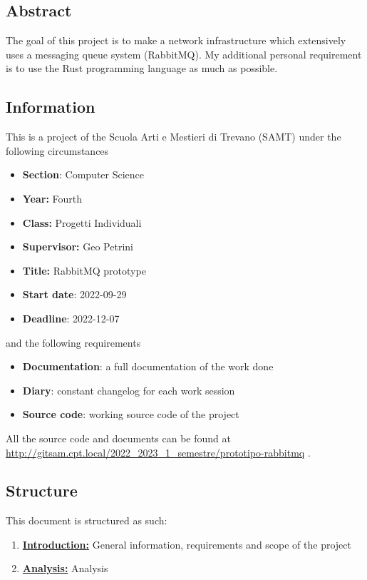 \documentclass[../documentation.tex]{subfiles}
\begin{document}
\subsection{Abstract}

The goal of this project is to make a network infrastructure
which extensively uses a messaging queue system (RabbitMQ).
My additional personal requirement is to use the Rust programming language
as much as possible.

\subsection{Information}

This is a project of the Scuola Arti e Mestieri di Trevano (SAMT) under the following circumstances

\begin{itemize}
    \item \textbf{Section}: Computer Science
    \item \textbf{Year:} Fourth
    \item \textbf{Class:} Progetti Individuali
    \item \textbf{Supervisor:} Geo Petrini
    \item \textbf{Title:} RabbitMQ prototype
    \item \textbf{Start date}: 2022-09-29
    \item \textbf{Deadline}: 2022-12-07
\end{itemize}

and the following requirements

\begin{itemize}
    \item \textbf{Documentation}: a full documentation of the work done
    \item \textbf{Diary}: constant changelog for each work session
    \item \textbf{Source code}: working source code of the project
\end{itemize}

All the source code and documents can be found at
\href{http://gitsam.cpt.local/2022\_2023\_1\_semestre/prototipo-rabbitmq}
{http://gitsam.cpt.local/2022\_2023\_1\_semestre/prototipo-rabbitmq}
\cite{gitrepo}.


\subsection{Structure}

This document is structured as such:

\begin{enumerate}
    \item \hyperlink{section.1}{\textbf{Introduction:}}
        General information, requirements and scope of the project

    \item \hyperlink{section.2}{\textbf{Analysis:}}
        Analysis
\end{enumerate}
\end{document}
